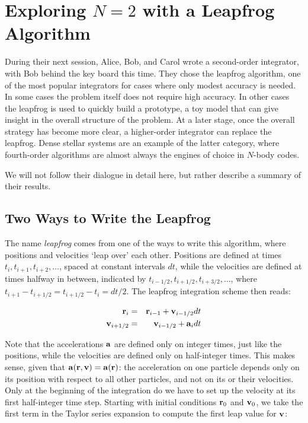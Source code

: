 \chapter{Exploring $N = 2$ with a Leapfrog Algorithm}

During their next session, Alice, Bob, and Carol wrote a second-order
integrator, with Bob behind the key board this time.  They chose the
leapfrog algorithm, one of the most popular integrators for cases
where only modest accuracy is needed.  In some cases the problem
itself does not require high accuracy.  In other cases the leapfrog is
used to quickly build a prototype, a toy model that can give insight
in the overall structure of the problem.  At a later stage, once the
overall strategy has become more clear, a higher-order integrator can
replace the leapfrog.  Dense stellar systems are an example of the
latter category, where fourth-order algorithms are almost always the
engines of choice in $N$-body codes.

We will not follow their dialogue in detail here, but rather describe
a summary of their results.

\section{Two Ways to Write the Leapfrog}

The name {\it leapfrog} comes from one of the ways to write this
algorithm, where positions and velocities `leap over' each other.
Positions are defined at times $t_i, t_{i+1}, t_{i+2}, \dots $, spaced
at constant intervals $dt$, while the velocities are defined at times
halfway in between, indicated by $t_{i-1/2}, t_{i+1/2}, t_{i+3/2}, \dots $,
where $t_{i+1} - t_{i + 1/2} = t_{i + 1/2} - t_i = dt / 2$.  
The leapfrog integration scheme then reads:

\begin{eqnarray}
\br_{i} & = & \br_{i-1} + \bv_{i-1/2} dt \label{leapfrog-leap-step1} \\
\bv_{i+1/2} & = & \bv_{i-1/2} + \ba_i dt \label{leapfrog-leap-step2}
\end{eqnarray}

Note that the accelerations ${\bf a}$ are defined only on integer times,
just like the positions, while the velocities are defined only on
half-integer times.  This makes sense, given that ${\bf a}({\bf r}, {\bf v}) = {\bf a}({\bf r})$:
the acceleration on one particle depends only on its position with respect
to all other particles, and not on its or their velocities.  Only at
the beginning of the integration do we have to set up the velocity at
its first half-integer time step.  Starting with initial conditions
${\bf r}_0$ and  ${\bf v}_0$, we take the first term in the Taylor series
expansion to compute the first leap value for ${\bf v}$:

